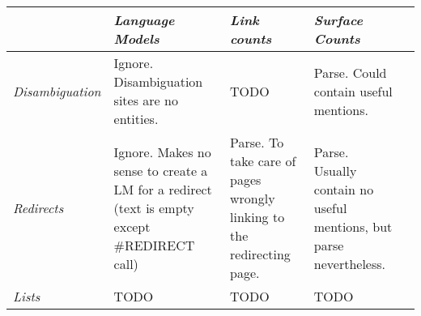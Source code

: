 \documentclass{article}
\begin{document}
\begin{tabular}{@{} *5l @{}}    \toprule
\emph{} & \emph{Language Models} & \emph{Link counts} & \emph{Surface Counts} &  \\\midrule
\emph{Disambiguation} & Ignore. Disambiguation sites are no entities. & TODO  & Parse. Could contain useful mentions.  \\
\emph{Redirects} & Ignore. Makes no sense to create a LM for a redirect (text is empty except \#REDIRECT call) & Parse. To take care of pages wrongly linking to the redirecting page. & Parse. Usually contain no useful mentions, but parse nevertheless. \\
\emph{Lists} & TODO & TODO & TODO \\\bottomrule
\hline
\end{tabular}
\end{document}
